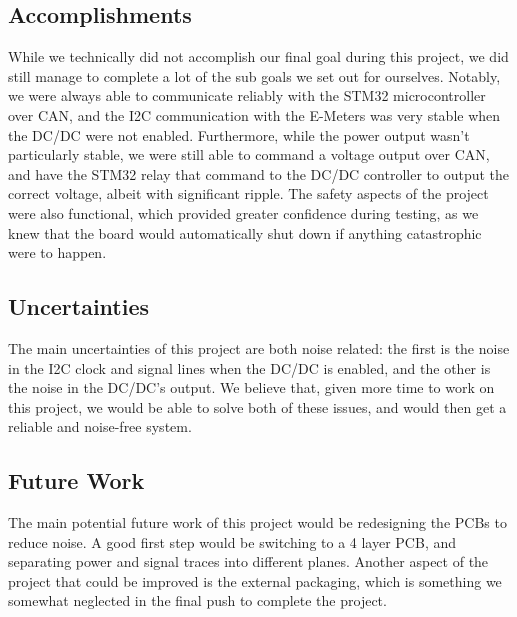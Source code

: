 \subsection{Accomplishments}
While we technically did not accomplish our final goal during this project, we did still manage to complete a lot of the sub goals we set out for ourselves.
Notably, we were always able to communicate reliably with the STM32 microcontroller over CAN, and the I2C communication with the E-Meters was very stable when the DC/DC were not enabled.
Furthermore, while the power output wasn't particularly stable, we were still able to command a voltage output over CAN, and have the STM32 relay that command to the DC/DC controller to output the correct voltage, albeit with significant ripple.
The safety aspects of the project were also functional, which provided greater confidence during testing, as we knew that the board would automatically shut down if anything catastrophic were to happen.

\subsection{Uncertainties}
The main uncertainties of this project are both noise related: the first is the noise in the I2C clock and signal lines when the DC/DC is enabled, and the other is the noise in the DC/DC's output.
We believe that, given more time to work on this project, we would be able to solve both of these issues, and would then get a reliable and noise-free system.

\subsection{Future Work}
The main potential future work of this project would be redesigning the PCBs to reduce noise. 
A good first step would be switching to a 4 layer PCB, and separating power and signal traces into different planes.
Another aspect of the project that could be improved is the external packaging, which is something we somewhat neglected in the final push to complete the project.

\cite{ref1}